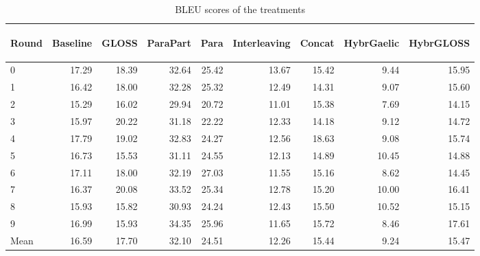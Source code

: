 \documentclass[final]{ua-thesis}
\numberwithin{equation}{section}
\begin{document}
\begin{table}[ht]
\centering
\begin{tabular}{lrrrrrrrr}
  \hline
\begin{sideways} Round \end{sideways} & \begin{sideways} Baseline \end{sideways} & \begin{sideways} GLOSS \end{sideways} & \begin{sideways} ParaPart \end{sideways} & \begin{sideways} Para \end{sideways} & \begin{sideways} Interleaving \end{sideways} & \begin{sideways} Concat \end{sideways} & \begin{sideways} HybrGaelic \end{sideways} & \begin{sideways} HybrGLOSS \end{sideways} \\ 
  \hline
0 & 17.29 & 18.39 & 32.64 & 25.42 & 13.67 & 15.42 & 9.44 & 15.95 \\ 
  1 & 16.42 & 18.00 & 32.28 & 25.32 & 12.49 & 14.31 & 9.07 & 15.60 \\ 
  2 & 15.29 & 16.02 & 29.94 & 20.72 & 11.01 & 15.38 & 7.69 & 14.15 \\ 
  3 & 15.97 & 20.22 & 31.18 & 22.22 & 12.33 & 14.18 & 9.12 & 14.72 \\ 
  4 & 17.79 & 19.02 & 32.83 & 24.27 & 12.56 & 18.63 & 9.08 & 15.74 \\ 
  5 & 16.73 & 15.53 & 31.11 & 24.55 & 12.13 & 14.89 & 10.45 & 14.88 \\ 
  6 & 17.11 & 18.00 & 32.19 & 27.03 & 11.55 & 15.16 & 8.62 & 14.45 \\ 
  7 & 16.37 & 20.08 & 33.52 & 25.34 & 12.78 & 15.20 & 10.00 & 16.41 \\ 
  8 & 15.93 & 15.82 & 30.93 & 24.24 & 12.43 & 15.50 & 10.52 & 15.15 \\ 
  9 & 16.99 & 15.93 & 34.35 & 25.96 & 11.65 & 15.72 & 8.46 & 17.61 \\ 
   \hline
Mean & 16.59 & 17.70 & 32.10 & 24.51 & 12.26 & 15.44 & 9.24 & 15.47 \\ 
   \hline
\end{tabular}
\caption{BLEU scores of the treatments} 
\label{table:complete_table}
\end{table}%
\end{document}
